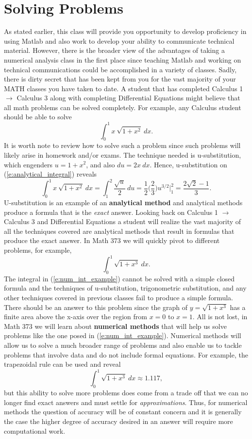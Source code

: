 \documentclass[twoside]{article}
\def\ds{\displaystyle}
\begin{document}
\section{Solving Problems}
As stated earlier, this class will provide you opportunity to develop proficiency in using Matlab and also work to develop your ability to communicate technical material. However, there is the broader view of the advantages of taking a numerical analysis class in the first place since teaching Matlab and working on technical communications could be accomplished in a variety of classes. Sadly, there is dirty secret that has been kept from you for the vast majority of your MATH classes you have taken to date. A student that has completed Calculus 1 $\rightarrow$ Calculus 3 along with completing Differential Equations might believe that all math problems can be solved completely. For example, any Calculus student should be able to solve 
\begin{equation}
\int_0^1 x \ \sqrt{1+x^2} \ dx.
\label{e:analytical_integral}
\end{equation}
It is worth note to review how to solve such a problem since such problems will likely arise in homework and/or exams. The technique needed is u-substitution, which engenders $\ds u = 1+x^2$, and also $\ds du = 2x \ dx$. Hence, u-substitution on (\ref{e:analytical_integral}) reveals
$$\int_0^1 x \ \sqrt{1+x^2} \ dx = \int_1^2 \frac {\sqrt{u}}2 \ du = \frac 12\biggr ( \frac 23 \biggr ) u^{3/2} \biggr \vert_1^2 = \frac {2\sqrt{2}-1}3 .$$
U-substitution is an example of an {\bf analytical method} and analytical methods produce a formula that is the {\it exact} answer. Looking back on Calculus 1 $\rightarrow$ Calculus 3 and Differential Equations a student will realize the vast majority of all the techniques covered are analytical methods that result in formulas that produce the exact answer. In Math 373 we will quickly pivot to different problems, for example,
\begin{equation}
\int_0^1 \sqrt{1+x^3} \  dx .
\label{e:num_int_example}
\end{equation}
The integral in (\ref{e:num_int_example}) cannot be solved with a simple closed formula and the techniques of u-substitution, trigonometric substitution, and any other techniques covered in previous classes fail to produce a simple formula. There should be an answer to this problem since the graph of $\ds y = \sqrt{1+x^3}$ has a finite area above the x-axis over the region from $x=0$ to $x=1$. All is not lost, in Math 373 we will learn about {\bf numerical methods} that will help us solve problems like the one posed in (\ref{e:num_int_example}). Numerical methods will allow us to solve a much broader range of problems and also enable us to tackle problems that involve data and do not include formal equations. For example, the trapezoidal rule can be used and reveal
$$\int_0^1 \sqrt{1+x^3} \  dx  \approx 1.117, $$
but this ability to solve more problems does come from a trade off that we can no longer find exact answers and must settle for {\it approximations}. Thus, for numerical methods the question of accuracy will be of constant concern and it is generally the case the higher degree of accuracy desired in an answer will require more computational work. 
\end{document}
